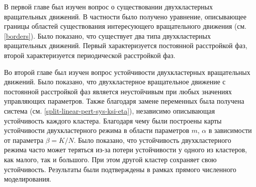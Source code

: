 В первой главе был изучен вопрос о существовании двухкластерных
вращательных движений. В частности было получено уравнение,
описывающее границы областей существования интересующего вращательного 
движения (см. \ref{borders}). Было показано, что существует два типа
двухкластерных вращательных движений. Первый характеризуется постоянной
расстройкой фаз, второй характеризуется периодической расстройкой фаз.


Во второй главе был изучен вопрос устойчивости двухкластерных
вращательных движений. Было показано, что двухкластерное вращательное
движение с постоянной расстройкой фаз является неустойчивым при любых значениях
управляющих параметров. Также благодаря замене переменных была получена система (см. \ref{split-linear-pert-sys-ksi-eta}),
независимо описывающая устойчивость каждого кластера. Благодаря чему были построены карты
устойчивости двухкластерного режима в области параметров $m$, $\alpha$ в зависимости от
параметра $\beta = K/N$. Было показано, что устойчивость
двухкластерного режима часто может теряться из-за потери устойчивости
у одного из кластеров, как малого, так и большого. При этом другой кластер
сохраняет свою устойчивость. Результаты были подтверждены в рамках прямого
численного моделирования.
